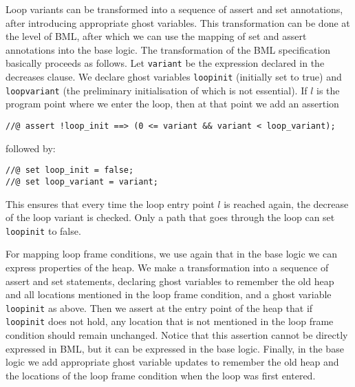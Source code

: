 Loop variants can be transformed into a sequence of assert and set
annotations, after introducing appropriate ghost variables. This
transformation can be done at the level of BML, after which we can use
the mapping of set and assert annotations into the
\mobius base logic. 
The transformation of the BML specification basically proceeds as
follows.  Let \texttt{variant} be the expression declared in the
decreases clause.  We declare ghost variables \texttt{loop\unsc init}
(initially set to true) and \texttt{loop\unsc variant} (the 
preliminary initialisation of which is not essential). 
If \(l\) is the program point where we
enter the loop, then at that point we add an assertion
\begin{verbatim}
//@ assert !loop_init ==> (0 <= variant && variant < loop_variant);
\end{verbatim}
followed by:
\begin{verbatim}
//@ set loop_init = false;
//@ set loop_variant = variant;
\end{verbatim}
This ensures that every time the loop entry point \(l\) is reached
again, the decrease of the loop variant is checked. Only a path that
goes through the loop can set \texttt{loop\unsc init} to false.

For mapping loop frame conditions, we use again that in the
\mobius base logic we can express properties of the heap. 
We make a transformation into a sequence of assert and set
statements, declaring ghost variables to remember the old heap and
all locations mentioned in the loop frame condition, and a ghost
variable \texttt{loop\unsc init} as above. Then we assert at the entry
point of the heap that if \texttt{loop\unsc init} does not hold, any
location that is not mentioned in the loop frame condition should
remain unchanged. Notice that this assertion cannot be directly
expressed in BML, but it can be expressed in the \mobius base
logic. Finally, in the \mobius base logic we add appropriate ghost
variable updates to remember the old heap and the locations of the
loop frame condition when the loop was first entered.









